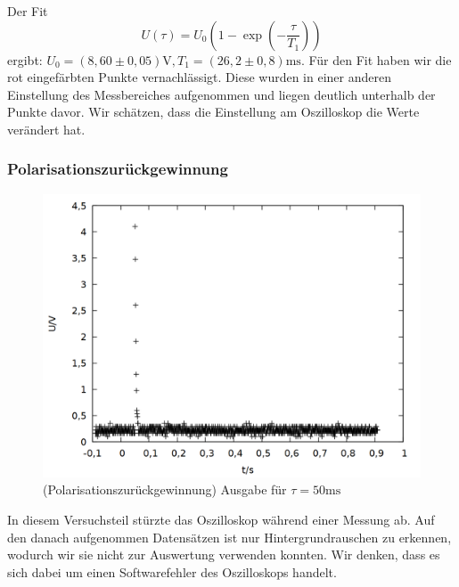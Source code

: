 Der Fit $$U(\tau) = U_0\left(1-\exp{\left(-\frac{\tau}{T_1}\right)}\right)$$ ergibt: $U_0 = (8,60\pm 0,05)\si{\volt}, T_1 = (26,2\pm 0,8) \si{\milli\second}$. Für den Fit haben wir die rot eingefärbten Punkte vernachlässigt. Diese wurden in einer anderen Einstellung des Messbereiches aufgenommen und liegen deutlich unterhalb der Punkte davor. Wir schätzen, dass die Einstellung am Oszilloskop die Werte verändert hat.

\subsubsection{Polarisationszurückgewinnung}
\begin{figure}[h]
\centering
\includegraphics[width=0.75\linewidth]{data/p402_443_data/polarisationszurueckgewinnung/plot_110.png}
\caption{(Polarisationszurückgewinnung) Ausgabe für $\tau = 50\si{\milli\second}$}
\label{fig:pol_bsp}
\end{figure}
In diesem Versuchsteil stürzte das Oszilloskop während einer Messung ab. Auf den danach aufgenommen Datensätzen ist nur Hintergrundrauschen zu erkennen, wodurch wir sie nicht zur Auswertung verwenden konnten. Wir denken, dass es sich dabei um einen Softwarefehler des Oszilloskops handelt.\\
 
